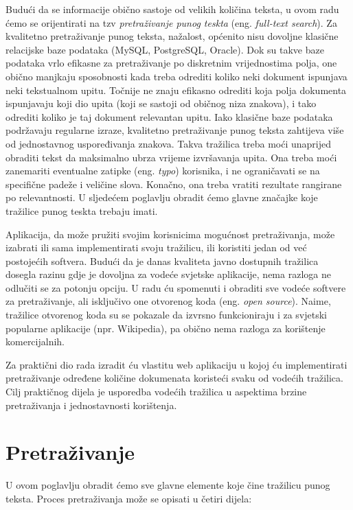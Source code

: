 \documentclass[a4paper,twoside,12pt]{scrreprt}
\begin{document}
Budući da se informacije obično sastoje od velikih količina teksta, u ovom radu ćemo se orijentirati na tzv \textit{pretraživanje punog teskta} (eng. \textit{full-text search}). Za kvalitetno pretraživanje punog teksta, nažalost, općenito nisu dovoljne klasične relacijske baze podataka (MySQL, PostgreSQL, Oracle). Dok su takve baze podataka vrlo efikasne za pretraživanje po diskretnim vrijednostima polja, one obično manjkaju sposobnosti kada treba odrediti koliko neki dokument ispunjava neki tekstualnom upitu. Točnije ne znaju efikasno odrediti koja polja dokumenta ispunjavaju koji dio upita (koji se sastoji od običnog niza znakova), i tako odrediti koliko je taj dokument relevantan upitu. Iako klasične baze podataka podržavaju regularne izraze, kvalitetno pretraživanje punog teksta zahtijeva više od jednostavnog uspoređivanja znakova. Takva tražilica treba moći unaprijed obraditi tekst da maksimalno ubrza vrijeme izvršavanja upita. Ona treba moći zanemariti eventualne zatipke (eng. \textit{typo}) korisnika, i ne ograničavati se na specifične padeže i veličine slova. Konačno, ona treba vratiti rezultate rangirane po relevantnosti. U sljedećem poglavlju obradit ćemo glavne značajke koje tražilice punog teskta trebaju imati.

Aplikacija, da može pružiti svojim korisnicima mogućnost pretraživanja, može izabrati ili sama implementirati svoju tražilicu, ili koristiti jedan od već postojećih softvera. Budući da je danas kvaliteta javno dostupnih tražilica dosegla razinu gdje je dovoljna za vodeće svjetske aplikacije, nema razloga ne odlučiti se za potonju opciju. U radu ću spomenuti i obraditi sve vodeće softvere za pretraživanje, ali isključivo one otvorenog koda (eng. \textit{open source}). Naime, tražilice otvorenog koda su se pokazale da izvrsno funkcioniraju i za svjetski popularne aplikacije (npr. Wikipedia), pa obično nema razloga za korištenje komercijalnih.

Za praktični dio rada izradit ću vlastitu web aplikaciju u kojoj ću implementirati pretraživanje određene količine dokumenata koristeći svaku od vodećih tražilica. Cilj praktičnog dijela je usporedba vodećih tražilica u aspektima brzine pretraživanja i jednostavnosti korištenja.

\chapter{Pretraživanje}

U ovom poglavlju obradit ćemo sve glavne elemente koje čine tražilicu punog teksta. Proces pretraživanja može se opisati u četiri dijela:
\end{document}
